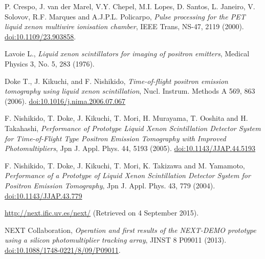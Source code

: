 \documentclass[12pt,a4paper,english,twoside]{article}
\begin{document}
\begin{thebibliography}{99}
P. Crespo, J. van der Marel, V.Y. Chepel, M.I. Lopes, D. Santos, L. Janeiro, V. Solovov, R.F. Marques and A.J.P.L. Policarpo, {\em Pulse processing for the PET liquid xenon multiwire ionisation chamber}, IEEE Trans, NS-47, 2119 (2000). \href{http://doi.org/10.1109/23.903858}{doi:10.1109/23.903858}.


Lavoie L., {\em Liquid xenon scintillators for imaging of positron emitters}, Medical Physics 3, No. 5, 283 (1976).

Doke T., J. Kikuchi, and F. Nishikido, {\em Time-of-flight positron emission tomography using liquid xenon scintillation}, Nucl. Instrum. Methods A 569, 863 (2006). \href{http://doi.org/10.1016/j.nima.2006.07.067}{doi:10.1016/j.nima.2006.07.067}

F. Nishikido, T. Doke, J. Kikuchi, T. Mori, H. Murayama, T. Ooshita and H. Takahashi, {\em Performance of Prototype Liquid Xenon Scintillation Detector System for Time-of-Flight Type Positron Emission Tomography with Improved Photomultipliers}, Jpn J. Appl. Phys. 44, 5193 (2005). \href{http://dx.doi.org/10.1143/JJAP.44.5193}{doi:10.1143/JJAP.44.5193}

F. Nishikido, T. Doke, J. Kikuchi, T. Mori, K. Takizawa and M. Yamamoto, {\em Performance of a Prototype of Liquid Xenon Scintillation Detector System for Positron Emission Tomography}, Jpn J. Appl. Phys. 43, 779 (2004). \href{http://dx.doi.org/10.1143/JJAP.43.779}{doi:10.1143/JJAP.43.779}

\url{http://next.ific.uv.es/next/} (Retrieved on 4 September 2015).

NEXT Collaboration, {\em Operation and first results of the NEXT-DEMO prototype using a silicon photomultiplier tracking array}, JINST 8 P09011 (2013). \href{http://dx.doi.org/10.1088/1748-0221/8/09/P09011}{doi:10.1088/1748-0221/8/09/P09011}.


\end{thebibliography}
\end{document}

